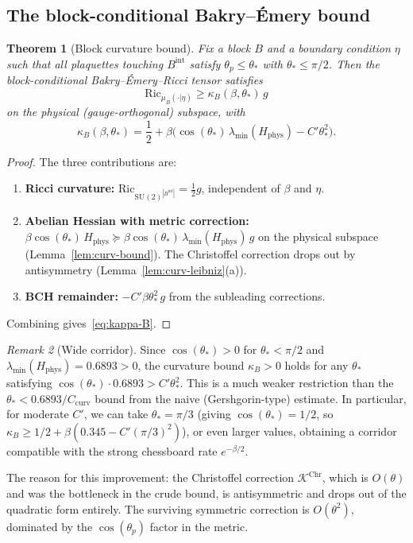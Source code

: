 \documentclass[11pt,a4paper]{article}
\theoremstyle{plain}
\newtheorem{theorem}{Theorem}[section]
\theoremstyle{definition}
\theoremstyle{remark}
\newtheorem{remark}[theorem]{Remark}
\newcommand{\SU}{\mathrm{SU}}
\newcommand{\Ric}{\mathrm{Ric}}
\newcommand{\cK}{\mathcal{K}}
\begin{document}
\subsection{The block-conditional Bakry--\'Emery bound}

\begin{theorem}[Block curvature bound]\label{thm:curvature}
Fix a block $B$ and a boundary condition $\eta$ such that all
plaquettes touching $B^{\mathrm{int}}$ satisfy
$\theta_p \leq \theta_*$ with $\theta_* \leq \pi/2$. Then the
block-conditional Bakry--\'Emery--Ricci tensor satisfies
\begin{equation}\label{eq:curvature-bound}
\Ric_{\mu_B(\cdot|\eta)}
\geq \kappa_B(\beta, \theta_*)\,g
\end{equation}
on the physical (gauge-orthogonal) subspace, with
\begin{equation}\label{eq:kappa-B}
\kappa_B(\beta, \theta_*) = \frac{1}{2}
+ \beta\bigl(\cos(\theta_*)\,\lambda_{\min}(H_{\mathrm{phys}})
- C'\theta_*^2\bigr).
\end{equation}
\end{theorem}

\begin{proof}
The three contributions are:
\begin{enumerate}[label=(\roman*)]
\item \textbf{Ricci curvature:}
  $\Ric_{\SU(2)^{|B^{\mathrm{int}}|}} = \frac{1}{2}g$,
  independent of $\beta$ and $\eta$.
\item \textbf{Abelian Hessian with metric correction:}
  $\beta\cos(\theta_*)\,H_{\mathrm{phys}} \succeq
  \beta\cos(\theta_*)\,\lambda_{\min}(H_{\mathrm{phys}})\,g$
  on the physical subspace (Lemma~\ref{lem:curv-bound}).
  The Christoffel correction drops out by antisymmetry
  (Lemma~\ref{lem:curv-leibniz}(a)).
\item \textbf{BCH remainder:}
  $-C'\beta\theta_*^2\,g$ from the subleading corrections.
\end{enumerate}
Combining gives~\eqref{eq:kappa-B}.
\end{proof}

\begin{remark}[Wide corridor]
Since $\cos(\theta_*) > 0$ for $\theta_* < \pi/2$ and
$\lambda_{\min}(H_{\mathrm{phys}}) = 0.6893 > 0$,
the curvature bound $\kappa_B > 0$ holds for any
$\theta_*$ satisfying $\cos(\theta_*)\cdot 0.6893 > C'\theta_*^2$.
This is a much weaker restriction than the
$\theta_* < 0.6893/C_{\mathrm{curv}}$ bound from the naive
(Gershgorin-type) estimate. In particular, for moderate $C'$,
we can take $\theta_* = \pi/3$ (giving $\cos(\theta_*) = 1/2$,
so $\kappa_B \geq 1/2 + \beta(0.345 - C'(\pi/3)^2)$),
or even larger values, obtaining a corridor compatible with
the strong chessboard rate $e^{-\beta/2}$.

The reason for this improvement: the Christoffel correction
$\cK^{\mathrm{Chr}}$, which is $O(\theta)$ and was the bottleneck in
the crude bound, is antisymmetric and drops out of the quadratic
form entirely. The surviving symmetric correction is $O(\theta^2)$,
dominated by the $\cos(\theta_p)$ factor in the metric.
\end{remark}
\end{document}
